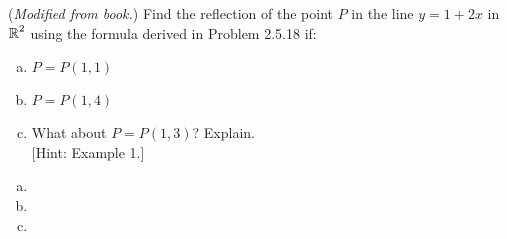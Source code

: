 \documentclass[../main.tex]{subfiles}
\begin{document}
(\emph{Modified from book.})
Find the reflection of the point $P$ in the line $y = 1 + 2x$ in $\operatorname{\mathbb{R}}^2$ using the formula derived in Problem 2.5.18 if:
\begin{enumerate}[a)]
	\item $P = P(1, 1)$
	\item $P = P(1, 4)$
	\item What about $P = P(1, 3)$? Explain. \\
	\hspace{0pt}[Hint: Example 1.]  %
\end{enumerate}

\solution
\begin{enumerate}[a)]
	\item  
	\item 
	\item 
\end{enumerate}
\end{document}
